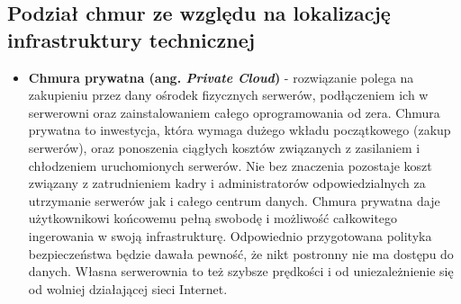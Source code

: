 \documentclass[10pt,a4paper,titlepage,twoside]{report}
\begin{document}
\subsection{Podział chmur ze względu na lokalizację infrastruktury technicznej}
\begin{itemize}
	\item \textbf{Chmura prywatna (ang. \textit{Private Cloud})} - rozwiązanie polega na zakupieniu przez dany ośrodek fizycznych serwerów, podłączeniem ich w serwerowni oraz zainstalowaniem całego oprogramowania od zera\cite{ad10}. Chmura prywatna to inwestycja, która wymaga dużego wkładu początkowego (zakup serwerów), oraz ponoszenia ciągłych kosztów związanych z zasilaniem i chłodzeniem uruchomionych serwerów. Nie bez znaczenia pozostaje koszt związany z zatrudnieniem kadry i administratorów odpowiedzialnych za utrzymanie serwerów jak i całego centrum danych. Chmura prywatna daje użytkownikowi końcowemu pełną swobodę i możliwość całkowitego ingerowania w swoją infrastrukturę. Odpowiednio przygotowana polityka bezpieczeństwa będzie dawała pewność, że nikt postronny nie ma dostępu do danych. Własna serwerownia to też szybsze prędkości i od uniezależnienie się od wolniej działającej sieci Internet\cite{ad11}.

\end{itemize}
\end{document}
